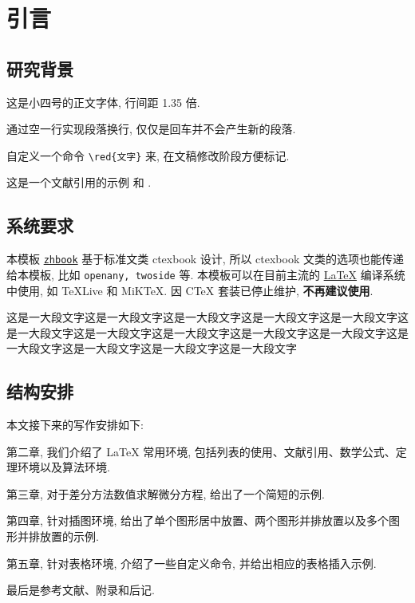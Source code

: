

\chapter{引言}\label{chap:Intro}

\section{研究背景}\label{sec:background}

这是小四号的正文字体, 行间距 1.35 倍.

通过空一行实现段落换行, 仅仅是回车并不会产生新的段落.

自定义一个命令 \verb|\red{文字}| 来, 在文稿修改阶段方便标记.

这是一个文献引用的示例 \cite{Tadmor2012} 和 \cite{LiLiu1997,Adams2003,TreWei2014}.

\section{系统要求}
本模板 \href{https://github.com/andy123t/zhbook}{\texttt{zhbook}} 基于标准文类 ctexbook 设计, 所以 ctexbook 文类的选项也能传递给本模板, 比如 \lstinline{openany, twoside} 等. 本模板可以在目前主流的 \href{https://en.wikibooks.org/wiki/LaTeX/Introduction}{\LaTeX{}} 编译系统中使用, 如 \TeX{}Live 和 MiK\TeX{}. 因 C\TeX{} 套装已停止维护, \textbf{不再建议使用}.

这是一大段文字这是一大段文字这是一大段文字这是一大段文字这是一大段文字这是一大段文字这是一大段文字这是一大段文字这是一大段文字这是一大段文字这是一大段文字这是一大段文字这是一大段文字这是一大段文字


\section{结构安排}

本文接下来的写作安排如下:

第二章, 我们介绍了 LaTeX 常用环境, 包括列表的使用、文献引用、数学公式、定理环境以及算法环境.

第三章, 对于差分方法数值求解微分方程, 给出了一个简短的示例.

第四章, 针对插图环境, 给出了单个图形居中放置、两个图形并排放置以及多个图形并排放置的示例.

第五章, 针对表格环境, 介绍了一些自定义命令, 并给出相应的表格插入示例.

最后是参考文献、附录和后记.

